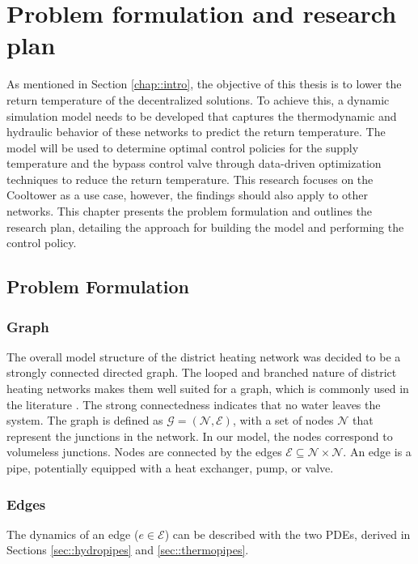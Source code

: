 \chapter{Problem formulation and research plan}\label{chap::PoA}
As mentioned in Section \ref{chap::intro}, the objective of this thesis is to lower the return temperature of the decentralized solutions. To achieve this, a dynamic simulation model needs to be developed that captures the thermodynamic and hydraulic behavior of these networks to predict the return temperature. The model will be used to determine optimal control policies for the supply temperature and the bypass control valve through data-driven optimization techniques to reduce the return temperature. This research focuses on the Cooltower as a use case, however, the findings should also apply to other networks. This chapter presents the problem formulation and outlines the research plan, detailing the approach for building the model and performing the control policy. 

\section{Problem Formulation} 
\subsection{Graph}
The overall model structure of the district heating network was decided to be a strongly connected directed graph. The looped and branched nature of district heating networks makes them well suited for a graph, which is commonly used in the literature \cite{sibeijn2025economic, Krug2020,OPPELT2016336,Simonssongraph}. The strong connectedness indicates that no water leaves the system. The graph is defined as $\mathcal{G}=(\mathcal{N}, \mathcal{E})$, with a set of nodes $\mathcal{N}$ that represent the junctions in the network. In our model, the nodes correspond to volumeless junctions. Nodes are connected by the edges $\mathcal{E} \subseteq \mathcal{N} \times \mathcal{N}$. An edge is a pipe, potentially equipped with a heat exchanger, pump, or valve. 

\subsection{Edges}
The dynamics of an edge ($e \in \mathcal{E}$) can be described with the two PDEs, derived in Sections \ref{sec::hydropipes} and \ref{sec::thermopipes}.

